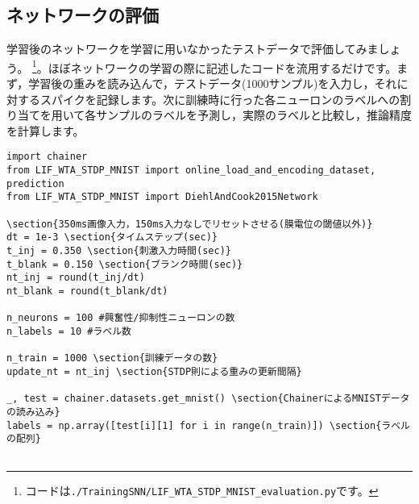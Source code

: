 \subsection{ネットワークの評価}
学習後のネットワークを学習に用いなかったテストデータで評価してみましょう。
\footnote{コードは\texttt{./TrainingSNN/LIF\_WTA\_STDP\_MNIST\_evaluation.py}です。}。ほぼネットワークの学習の際に記述したコードを流用するだけです。まず，学習後の重みを読み込んで，テストデータ(1000サンプル)を入力し，それに対するスパイクを記録します。次に訓練時に行った各ニューロンのラベルへの割り当てを用いて各サンプルのラベルを予測し，実際のラベルと比較し，推論精度を計算します。
\begin{verbatim}
import chainer
from LIF_WTA_STDP_MNIST import online_load_and_encoding_dataset, prediction
from LIF_WTA_STDP_MNIST import DiehlAndCook2015Network

\section{350ms画像入力，150ms入力なしでリセットさせる(膜電位の閾値以外)}
dt = 1e-3 \section{タイムステップ(sec)}
t_inj = 0.350 \section{刺激入力時間(sec)}
t_blank = 0.150 \section{ブランク時間(sec)}
nt_inj = round(t_inj/dt)
nt_blank = round(t_blank/dt)

n_neurons = 100 #興奮性/抑制性ニューロンの数
n_labels = 10 #ラベル数

n_train = 1000 \section{訓練データの数}
update_nt = nt_inj \section{STDP則による重みの更新間隔}

_, test = chainer.datasets.get_mnist() \section{ChainerによるMNISTデータの読み込み}
labels = np.array([test[i][1] for i in range(n_train)]) \section{ラベルの配列}


\end{verbatim}
